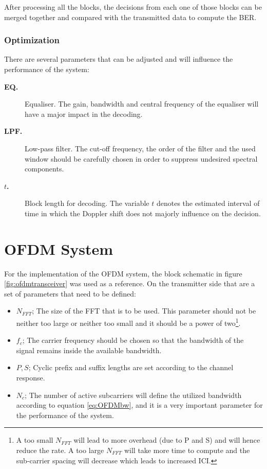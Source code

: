 \documentclass[12pt,a4paper,openright]{report}
\begin{document}
After processing all the blocks, the decisions from each one of those blocks can be merged together and compared with the transmitted data to compute the BER. 

\subsubsection{Optimization}

There are several parameters that can be adjusted and will influence the performance of the system:
\begin{description}
\item[\bf EQ.] Equaliser. The gain, bandwidth and central frequency of the equaliser will have a major impact in the decoding.
\item[\bf LPF.] Low-pass filter. The cut-off frequency, the order of the filter and the used window should be carefully chosen in order to suppress undesired spectral components. 
\item[\bf $t$.] Block length for decoding. The variable $t$ denotes the estimated interval of time in which the Doppler shift does not majorly influence on the decision. 
\end{description}


\section{OFDM System}

For the implementation of the OFDM system, the block schematic in figure \ref{fig:ofdmtransceiver} was used as a reference. On the transmitter side that are a set of parameters that need to be defined:
\begin{itemize}
\item $N_{FFT}$; The size of the FFT that is to be used. This parameter should not be neither too large or neither too small and it should be a power of two\footnote{A too small  $N_{FFT}$ will lead to more overhead (due to P and S) and will hence reduce the rate. A too large $N_{FFT}$ will take more time to compute and the sub-carrier spacing will decrease which leads to increased ICI.}.
%
\item    $f_c$; The carrier frequency should be chosen so that the bandwidth of the signal remains inside the available bandwidth.
\item $ P,S$; Cyclic prefix and suffix lengths are set according to the channel response.
 \item $N_c$; The number of active subcarriers will define the utilized bandwidth according to equation \ref{eq:OFDMbw}, and it is a very important parameter for the performance of the system. 

\end{itemize}
\end{document}
